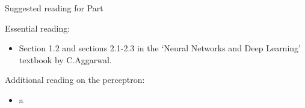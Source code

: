 %
%
%

\begin{frame}{Suggested reading for Part \thispart}

    {
    \small
    Essential reading:
    \begin{itemize}
        \scriptsize
        \item Section 1.2 and sections 2.1-2.3 in the 
        `Neural Networks and Deep Learning' textbook 
        by C.Aggarwal\cite{Aggarwal:2018SpringerDL}.
    \end{itemize}
    
    Additional reading on the perceptron:
    \begin{itemize}
        \scriptsize
        \item a    
    \end{itemize}
    }


\end{frame}